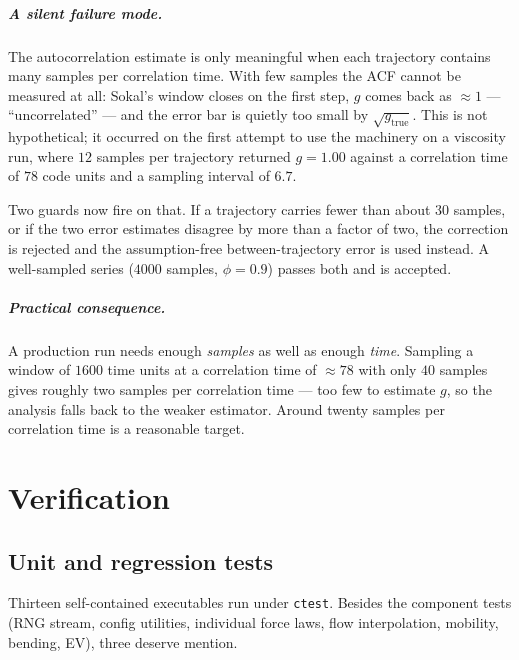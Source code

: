 \documentclass[11pt,a4paper]{report}
\newcommand{\code}[1]{\texttt{\seqsplitcode{#1}}}
\newcommand{\seqsplitcode}[1]{#1}
\begin{document}
\paragraph{A silent failure mode.} The autocorrelation estimate is only meaningful
when each trajectory contains many samples per correlation time. With few samples
the ACF cannot be measured at all: Sokal's window closes on the first step, $g$
comes back as $\approx 1$ --- ``uncorrelated'' --- and the error bar is quietly too
small by $\sqrt{g_{\mathrm{true}}}$. This is not hypothetical; it occurred on the
first attempt to use the machinery on a viscosity run, where $12$ samples per
trajectory returned $g = 1.00$ against a correlation time of $78$ code units and a
sampling interval of $6.7$.

Two guards now fire on that. If a trajectory carries fewer than about $30$
samples, or if the two error estimates disagree by more than a factor of two, the
correction is rejected and the assumption-free between-trajectory error is used
instead. A well-sampled series ($4000$ samples, $\phi = 0.9$) passes both and is
accepted.

\paragraph{Practical consequence.} A production run needs enough \emph{samples} as
well as enough \emph{time}. Sampling a window of $1600$ time units at a
correlation time of $\approx78$ with only $40$ samples gives roughly two samples
per correlation time --- too few to estimate $g$, so the analysis falls back to the
weaker estimator. Around twenty samples per correlation time is a reasonable
target.

\chapter{Verification}
\label{ch:verification}

\section{Unit and regression tests}

Thirteen self-contained executables run under \code{ctest}. Besides the
component tests (RNG stream, config utilities, individual force laws, flow
interpolation, mobility, bending, EV), three deserve mention.
\end{document}
